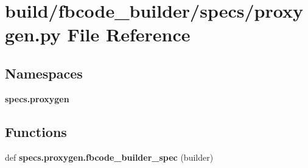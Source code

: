 \section{build/fbcode\+\_\+builder/specs/proxygen.py File Reference}
\label{proxygen_8py}
\subsection*{Namespaces}
\begin{DoxyCompactItemize}
\item 
 {\bf specs.\+proxygen}
\end{DoxyCompactItemize}
\subsection*{Functions}
\begin{DoxyCompactItemize}
\item 
def {\bf specs.\+proxygen.\+fbcode\+\_\+builder\+\_\+spec} (builder)
\end{DoxyCompactItemize}
